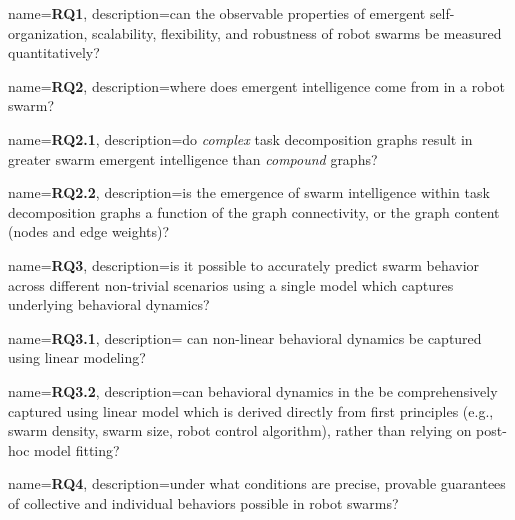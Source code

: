 {
  name={\textbf{RQ1}},
  description={can the observable properties of emergent
      self-organization, scalability, flexibility, and robustness of robot
      swarms be measured quantitatively?}  }

{
  name={\textbf{RQ2}},
  description={where does emergent intelligence come from in a robot swarm?}
}

{
  name={\textbf{RQ2.1}},
  description={do \emph{complex} task decomposition graphs result in
      greater swarm emergent intelligence than \emph{compound} graphs?}
}

{
  name={\textbf{RQ2.2}},
  description={is the emergence of swarm intelligence within task
        decomposition graphs a function of the graph connectivity, or
        the graph content (nodes and edge weights)?}
}

{
  name={\textbf{RQ3}},
  description={is it possible to accurately predict swarm behavior
      across different non-trivial scenarios using a single model which captures
      underlying behavioral dynamics?}  }

{
  name={\textbf{RQ3.1}},
  description={ can non-linear behavioral dynamics be captured using
      linear modeling?  } }

 {
  name={\textbf{RQ3.2}},
  description={can behavioral dynamics in the be comprehensively captured using
    linear model which is derived directly from first principles (e.g., swarm
    density, swarm size, robot control algorithm), rather than relying on
    post-hoc model fitting?}  }

{
  name={\textbf{RQ4}},
  description={under what conditions are precise, provable guarantees of
      collective and individual behaviors possible in robot swarms?}
}
